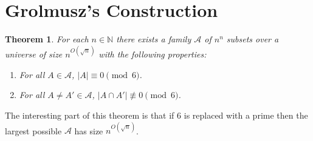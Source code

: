 \documentclass[12pt]{article}
\newtheorem{theorem}{Theorem}[section]
\def\N{{\mathbb N}}
\newcommand{\calA}{\mathcal{A}}
\begin{document}
\section{Grolmusz's Construction}


\begin{theorem}
  For each $n\in\N$ there exists a family $\calA$ of $n^n$ subsets over a
  universe of size $n^{O(\sqrt{n})}$ with the following properties:
  \begin{enumerate}
    \item For all $A\in\calA$, $|A| \equiv 0 \pmod 6$.
    \item For all $A\neq A'\in \calA$, $|A \cap A'| \not\equiv 0 \pmod 6$.
  \end{enumerate}
\end{theorem}

The interesting part of this theorem is that if $6$ is replaced with a prime
then the largest possible $\calA$ has size $n^{O(\sqrt{n})}$.
\end{document}

